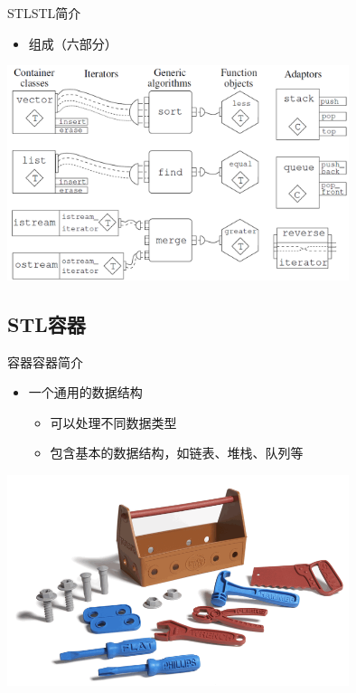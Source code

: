 \begin{frame}[t, fragile]{STL}{STL简介}%
  \begin{itemize}
  \item 组成（六部分）   
  \end{itemize}
  \begin{center}
    \includegraphics[width=0.75\textwidth]{figure/chap07/02stl04}
  \end{center}  
\end{frame}

\subsection[容器]{STL容器}\label{sec:chap07-sec03-02}
\begin{frame}[t, fragile]{容器}{容器简介}%
  \begin{itemize}
  \item 一个通用的数据结构
    \begin{itemize}
    \item 可以处理不同数据类型
    \item 包含基本的数据结构，如链表、堆栈、队列等
    \end{itemize}
  \end{itemize}
  \begin{center}
    \includegraphics[width=0.75\textwidth]{figure/chap07/03stl05}    
  \end{center}  
\end{frame}

